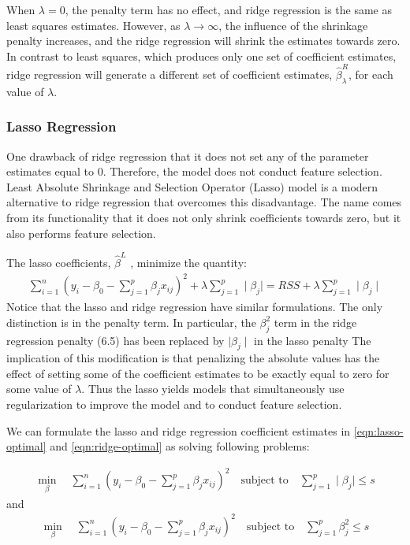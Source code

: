 When $\lambda = 0$, the penalty term has no effect, and ridge regression is the same
as least squares estimates. However, as $\lambda \to \infty$, the influence of
the shrinkage penalty increases, and the ridge regression will shrink the
estimates towards  zero.
In contrast to least squares, which produces only one set of coefficient
estimates, ridge regression will generate a different set of coefficient
estimates, $\hat{\beta}_{\lambda} ^ {R}$, for each value of $\lambda$.

\subsubsection*{Lasso Regression}

One drawback of ridge regression that it does not set any of the parameter
estimates equal to 0. Therefore, the model does not conduct feature selection.
Least Absolute Shrinkage and Selection Operator (Lasso)
\parencite{tibshirani1996regression} model is a modern
alternative to ridge regression that overcomes this disadvantage. The name comes
from its functionality that it does not only shrink coefficients towards zero,
but it also performs feature selection.


The lasso  coefficients, $\hat{\beta}^L$ , minimize the quantity:
\begin{eqnarray}
    \label{eqn:lasso-optimal}
    \sum_{i=1}^{n}(y_i -\beta_0 - \sum_{j=1}^{p}\beta_j x_{ij}) ^ 2 + \lambda
    \sum_{j=1}^{p} \mid \beta_{j} \mid= RSS + \lambda \sum_{j=1}^{p} \mid \beta_{j} \mid
\end{eqnarray}
Notice that the lasso and ridge regression have similar formulations. The only distinction is in the penalty term. In particular, the $\beta_j^2$ term in the ridge regression penalty (6.5) has been replaced by $\mid \beta_{j} \mid$ in the lasso penalty
The implication of this modification is that penalizing the absolute values has the effect of setting some of the coefficient estimates to be exactly equal to zero for some value of $\lambda$. Thus the lasso yields models that simultaneously use regularization to improve the model and to conduct feature selection.

We can formulate the lasso and ridge regression coefficient estimates in
\ref{eqn:lasso-optimal} and \ref{eqn:ridge-optimal} as solving following
problems:

\begin{equation}
    \label{eqn:ridge-optimal}
    \begin{aligned}
    \min_{\beta} \quad \sum_{i=1}^{n}(y_i -\beta_0 - \sum_{j=1}^{p}\beta_j
    x_{ij}) ^ 2  \quad \textrm{subject to} \quad \sum_{j=1}^{p}\mid\beta_j\mid
    \leq s
    \end{aligned}
\end{equation}
and
\begin{equation}
    \label{eqn:lass-optimal}
    \begin{aligned}
    \min_{\beta} \quad \sum_{i=1}^{n}(y_i -\beta_0 - \sum_{j=1}^{p}\beta_j
    x_{ij}) ^ 2  \quad \textrm{subject to} \quad \sum_{j=1}^{p}\beta_j^2\leq s
    \end{aligned}
\end{equation}

